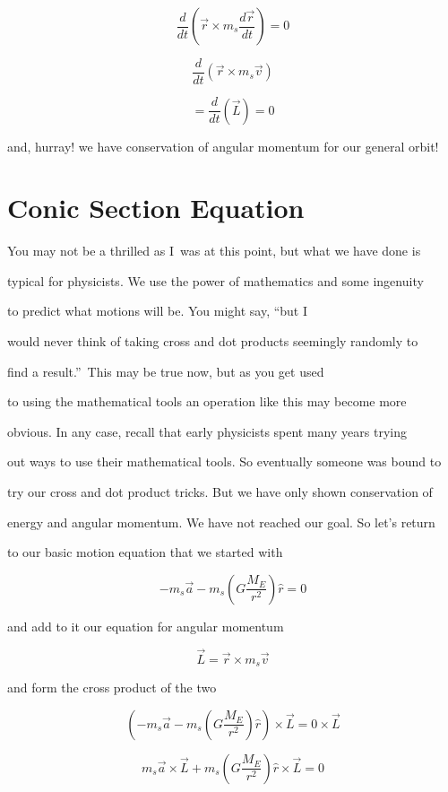 $$\frac{d}{dt}\left( \overrightarrow{r}\times m_{s}\frac{d\overrightarrow{r}}{dt}\right) =0$$

$$\frac{d}{dt}\left( \overrightarrow{r}\times m_{s}\overrightarrow{v}\right) $$



$$=\frac{d}{dt}\left( \overrightarrow{L}\right) =0$$

and, hurray! we have conservation of angular momentum for our general orbit!


\section{Conic Section Equation}


You may not be a thrilled as I\ was at this point, but what we have done is

typical for physicists. We use the power of mathematics and some ingenuity

to predict what motions will be. You might say, \textquotedblleft but I\

would never think of taking cross and dot products seemingly randomly to

find a result.\textquotedblright\ This may be true now, but as you get used

to using the mathematical tools an operation like this may become more

obvious. In any case, recall that early physicists spent many years trying

out ways to use their mathematical tools. So eventually someone was bound to

try our cross and dot product tricks. But we have only shown conservation of

energy and angular momentum. We have not reached our goal. So let's return

to our basic motion equation that we started with%

$$-m_{s}\overrightarrow{a}-m_{s}\left( G\frac{M_{E}}{r^{2}}\right) \hat{r}=0 $$

and add to it our equation for angular momentum 

$$\overrightarrow{L}=\overrightarrow{r}\times m_{s}\overrightarrow{v}$$

and form the cross product of the two%

$$\left( -m_{s}\overrightarrow{a}-m_{s}\left( G\frac{M_{E}}{r^{2}}\right) \hat{r}\right) \times \overrightarrow{L}=0\times \overrightarrow{L}$$

$$m_{s}\overrightarrow{a}\times \overrightarrow{L}+m_{s}\left( G\frac{M_{E}}{r^{2}}\right) \hat{r}\times \overrightarrow{L}=0 $$

